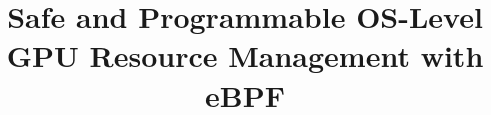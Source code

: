 \documentclass[sigplan,anonymous,review,nonacm]{acmart}
\newcommand{\sys}{gpubpf\xspace}
\begin{document}
\title{Safe and Programmable OS-Level  GPU Resource Management with eBPF}

%


\end{document}
